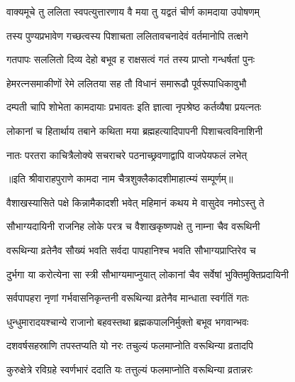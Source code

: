 \twolineshloka
{वाक्यमूचे तु ललिता स्वपत्युत्तारणाय वै}
{मया तु यद्वतं चीर्ण कामदाया उपोषणम्} %

\twolineshloka
{तस्य पुण्यप्रभावेण गच्छत्वस्य पिशाचता}
{ललितावचनादेवं वर्तमानोपि तत्क्षगे} %

\twolineshloka
{गतपापः सललितो दिव्य देहो बभूव ह}
{राक्षसत्वं गतं तस्य प्राप्तो गन्धर्षतां पुनः} %

\twolineshloka
{हेमरत्नसमाकीणों रेमे ललितया सह}
{तौ विधानं समारूढौ पूर्वरूपाधिकावुभौ} %

\twolineshloka
{दम्पती चापि शोभेता कामदायाः प्रभावतः}
{इति ज्ञात्वा नृपश्रेष्ठ कर्तव्यैषा प्रयत्नतः} %

\twolineshloka
{लोकानां च हितार्थाय तबाने कथिता मया}
{ब्रह्महत्यादिपापनी पिशाचत्वविनाशिनी} %

\twolineshloka
{नातः परतरा काचित्रैलोक्ये सचराचरे}
{पठनाच्छ्रवणाद्वापि वाजपेयफलं लभेत्} %

॥इति श्रीवाराहपुराणे कामदा नाम चैत्रशुक्लैकादशीमाहात्म्यं सम्पूर्णम्॥


\hyperref[sec:ekadashi_mahatmyam_vrata_raja]{\closesub}
\clearpage

\label{sec:vrata-raja-vaishakha-krishna-varuthini}


\twolineshloka
{वैशाखस्यासिते पक्षे किन्नामैकादशी भवेत्}
{महिमानं कथय मे वासुदेव नमोऽस्तु ते} %


\twolineshloka
{सौभाग्यदायिनी राजनिह लोके परत्र च}
{वैशाखकृष्णपक्षे तु नाम्ना चैव वरूथिनी} %

\twolineshloka
{वरूथिन्या व्रतेनैव सौख्यं भवति सर्वदा}
{पापहानिश्च भवति सौभाग्यप्राप्तिरेव च} %

\twolineshloka
{दुर्भगा या करोत्येना सा स्त्री सौभाग्यमाप्नुयात्}
{लोकानां चैव सर्वेषां भुक्तिमुक्तिप्रदायिनी} %

\twolineshloka
{सर्वपापहरा नृणां गर्भवासनिकृन्तनी}
{वरूथिन्या व्रतेनैव मान्धाता स्वर्गतिं गतः} %

\twolineshloka
{धुन्धुमारादयश्चान्ये राजानो बहवस्तथा}
{ब्रह्मकपालनिर्मुक्तो बभूव भगवान्भवः} %

\twolineshloka
{दशवर्षसहस्राणि तपस्तप्यति यो नरः}
{तचुल्यं फलमाप्नोति वरूथिन्या व्रतादपि} %

\twolineshloka
{कुरुक्षेत्रे रविग्रहे स्वर्णभारं ददाति यः}
{तत्तुल्यं फलमाप्नोति वरूथिन्या व्रतान्नरः} %

